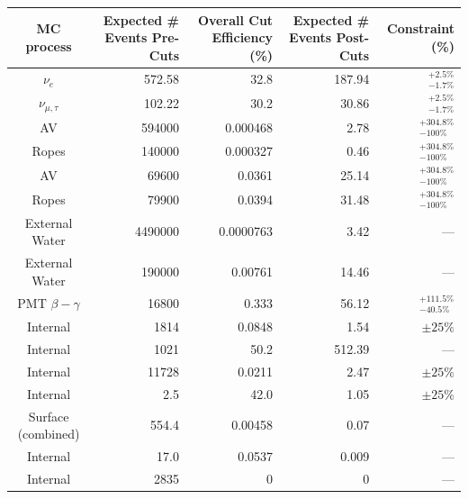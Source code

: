 \begin{table}
    \begin{center}
        \begin{tabulary}{\textwidth}{c R R R R}
            \hline
            MC process       & Expected \# Events Pre-Cuts & Overall Cut Efficiency (\%) & Expected \# Events Post-Cuts & Constraint (\%) \\ \hline \hline
            \beight{} $\nu_{e}$          & 572.58 & 32.8       & 187.94 & $^{+2.5\%}_{-1.7\%}$ \\
            \beight{} $\nu_{\mu,\tau}$   & 102.22 & 30.2       & 30.86  & $^{+2.5\%}_{-1.7\%}$ \\
            \hline
            AV              &\num{594000}&0.000468& 2.78   & $^{+304.8\%}_{-100\%}$ \\
            Ropes           &\num{140000}&0.000327& 0.46   & $^{+304.8\%}_{-100\%}$ \\
            AV              &\num{69600} & 0.0361 & 25.14  & $^{+304.8\%}_{-100\%}$ \\
            Ropes           &\num{79900} & 0.0394 & 31.48  & $^{+304.8\%}_{-100\%}$ \\
            External Water  &\num{4490000}&0.0000763& 3.42 & --- \\
            External Water  &\num{190000}& 0.00761&  14.46 & --- \\
            PMT $\beta-\gamma$           &\num{16800} & 0.333  &  56.12 & $^{+111.5\%}_{-40.5\%}$ \\
            \hline
            Internal      & \num{1814} & 0.0848 & 1.54   & $\pm 25\%$  \\
            Internal        & \num{1021} & 50.2   & 512.39 & --- \\
            Internal      & \num{11728}& 0.0211 & 2.47   & $\pm 25\%$ \\
            Internal        & \num{2.5}  & 42.0   & 1.05   & $\pm 25\%$ \\ \hline
            Surface \alphan{} (combined) & \num{554.4}& 0.00458& 0.07   & --- \\
            Internal \alphan{}           & \num{17.0} & 0.0537 & 0.009  & --- \\
            Internal        & \num{2835} & 0      & 0      & --- \\

\end{tabulary}
\end{center}
\end{table}

